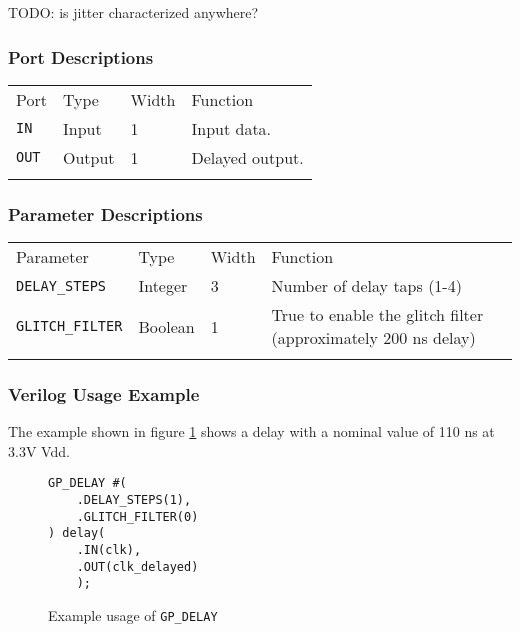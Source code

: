 \documentclass[11pt]{article}
\newcommand{\tokenstyle}[1]{\texttt{#1}}
\newcommand{\whenstyle}[1]{{\fontseries{sb}\selectfont#1}}
\newcommand{\thinhline}{\Xhline{1\arrayrulewidth}}
\newcommand{\thickhline}{\Xhline{2.5\arrayrulewidth}}
\begin{document}
TODO: is jitter characterized anywhere?

\subsubsection{Port Descriptions}

\begin{tabularx}{\textwidth}{lllX}
\thinhline
\whenstyle{Port} & \whenstyle{Type} & \whenstyle{Width} & \whenstyle{Function} \\
\thickhline
\tokenstyle{IN} & Input & 1 & Input data. \\
\thinhline
\tokenstyle{OUT} & Output & 1 & Delayed output. \\
\thinhline
\end{tabularx}

\subsubsection{Parameter Descriptions}

\begin{tabularx}{\textwidth}{lllX}
\thinhline
\whenstyle{Parameter} & \whenstyle{Type} & \whenstyle{Width} & \whenstyle{Function} \\
\thickhline
\tokenstyle{DELAY\_STEPS} & Integer & 3 & Number of delay taps (1-4) \\
\thinhline
\tokenstyle{GLITCH\_FILTER} & Boolean & 1 & True to enable the glitch filter (approximately 200 ns delay) \\
\thinhline
\end{tabularx}

\subsubsection{Verilog Usage Example}

The example shown in figure \ref{gp-delay-example} shows a delay with a nominal value of 110 ns at 3.3V Vdd.

\begin{figure}[h]
\begin{lstlisting}
GP_DELAY #(
	.DELAY_STEPS(1),
	.GLITCH_FILTER(0)
) delay(
	.IN(clk),
	.OUT(clk_delayed)
	);
\end{lstlisting}
\caption{Example usage of \tokenstyle{GP\_DELAY}}
\label{gp-delay-example}
\end{figure}

\end{document}
